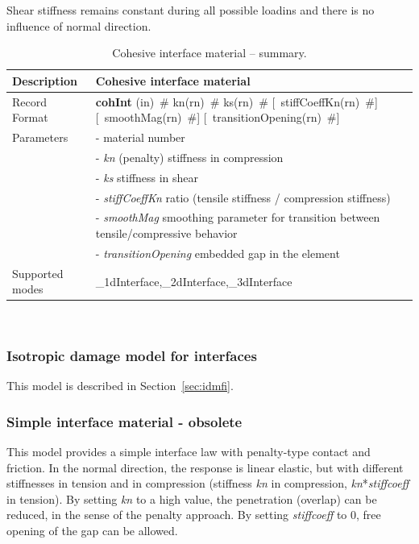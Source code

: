 \documentclass[a4paper]{article}
\newcommand{\descitem}[1]{{\noindent \bf #1}}
\newcommand{\elemparam}[2]{{{#1\tiny (#2)}~\#}}
\newcommand{\optelemparam}[2]{[{~\elemparam{#1}{#2}}]}
\newcommand{\param}[1]{{\it #1}}
\newenvironment{mmt}{\begin{tabular}{|l|p{9cm}|}}{\end{tabular}\\}
\newenvironment{mmt}{\begin{tabular}{|l|l|}}{\end{tabular}\\}
\begin{document}
Shear stiffness remains constant during all possible loadins and there is no influence of normal direction.

\begin{table}[!htb]
\begin{mmt}
\hline
Description & Cohesive interface material\\
\hline
Record Format & \descitem{cohInt}  \elemparam{}{in}
\elemparam{kn}{rn} \elemparam{ks}{rn} \optelemparam{stiffCoeffKn}{rn}
\optelemparam{smoothMag}{rn} \optelemparam{transitionOpening}{rn}\\
Parameters &- \param{} material number\\
&- \param{kn} (penalty) stiffness in compression\\
&- \param{ks} stiffness in shear\\
&- \param{stiffCoeffKn} ratio (tensile stiffness / compression stiffness)\\
&- \param{smoothMag} smoothing parameter for transition between tensile/compressive behavior\\
&- \param{transitionOpening} embedded gap in the element\\
Supported modes& \_1dInterface,\_2dInterface,\_3dInterface\\
\hline
\end{mmt}
\caption{Cohesive interface material -- summary.}
\label{cohint_table}
\end{table}

\subsubsection{Isotropic damage model for interfaces}

This model is described in Section~\ref{sec:idmfi}.

\subsubsection{Simple interface material - obsolete}

This model provides a simple interface law with penalty-type contact and friction. 
In the normal direction, the response is linear elastic, but with different stiffnesses in tension and in compression (stiffness \param{kn} in compression, \param{kn}*\param{stiffcoeff} in tension). 
By setting \param{kn} to a high value, the penetration (overlap) can be reduced,
in the sense of the penalty approach. By setting  \param{stiffcoeff} to 0, free opening
of the gap can be allowed. 
\end{document}
